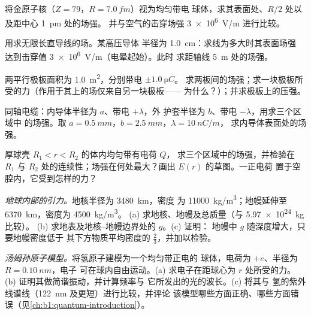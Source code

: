 \begin{exercise}[$\star\star$]\label{exo:b1:electrostatics-gauss:6}
将金原子核（$Z = 79$，$R = \qty{7.0}{fm}$）视为均匀带电
球体，求其表面处、$R/2$ 处以及距中心 \qty{1}{pm} 处的场强。
并与空气的击穿场强 \qty{3e6}{V/m} 进行比较。
\end{exercise}

\begin{exercise}[$\star\star$]\label{exo:b1:electrostatics-gauss:7}
用求无限长直导线的场。某高压导体
半径为 \qty{1.0}{cm}：求线为多大时其表面场强
达到击穿值 \qty{3e6}{V/m}（电晕起始）。此时
求距轴线 \qty{5}{m} 处的场强。
\end{exercise}

\begin{exercise}[$\star\star$]\label{exo:b1:electrostatics-gauss:8}
两平行极板面积为 \qty{1.0}{m^2}，分别带电 $\pm\qty{1.0}{\micro C}$。
求两板间的场强；求一块极板所受的力（作用于其上的场仅来自另一块极板——
为什么？）；并求极板上的压强。
\end{exercise}

\begin{exercise}[$\star\star$]\label{exo:b1:electrostatics-gauss:9}
同轴电缆：内导体半径为 $a$、带电 $+\lambda$，外
护套半径为 $b$、带电 $-\lambda$，用求三个区域中
的场强。取 $a = \qty{0.5}{mm}$，$b = \qty{2.5}{mm}$，$\lambda = \qty{10}{nC/m}$，
求内导体表面处的场强。
\end{exercise}

\begin{exercise}[$\star\star\star$]\label{exo:b1:electrostatics-gauss:10}
厚球壳 $R_1 < r < R_2$ 的体内均匀带有电荷 $Q$，
求三个区域中的场强，并检验在 $R_1$
与 $R_2$ 处的连续性；场强在何处最大？画出 $E(r)$ 的草图。一正电荷
置于空腔内，它受到怎样的力？
\end{exercise}

\begin{exercise}[$\star\star\star$]\label{exo:b1:electrostatics-gauss:11}
\emph{地球内部的引力。}地核半径为 \qty{3480}{km}，密度
为 \qty{11000}{kg/m^3}；地幔延伸至 \qty{6370}{km}，密度为 \qty{4500}{kg/m^3}。
(a) 求地核、地幔及总质量（与 \qty{5.97e24}{kg} 比较）。
(b) 求地表及地核–地幔边界处的 $g$。(c) 证明：
地幔中 $g$ 随深度增大，只要地幔密度低于
其下方物质平均密度的 $\tfrac23$，并加以检验。
\end{exercise}

\begin{exercise}[$\star\star\star$]\label{exo:b1:electrostatics-gauss:12}
\emph{汤姆孙原子模型。}将氢原子建模为一个均匀带正电的
球体，电荷为 $+e$、半径为 $R = \qty{0.10}{nm}$，电子
可在球内自由运动。(a) 求电子在距球心为 $r$ 处所受的力。
(b) 证明其做简谐振动，并计算频率与
它所发出的光的波长。(c) 将其与
氢的紫外线谱线（\qty{122}{nm} 及更短）进行比较，并评论
该模型哪些方面正确、哪些方面错误（见\cref{ch:b1:quantum-introduction}）。
\end{exercise}

